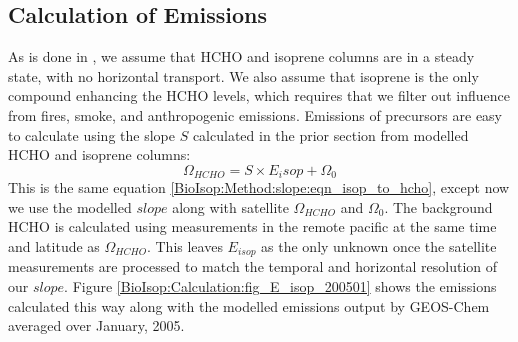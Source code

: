     
    
    
    
    
  \subsection{Calculation of Emissions}
    \label{BioIsop:Calculation}
   
    As is done in \textcite{Palmer2003, Millet2006, Bauwens2016}, we assume that HCHO and isoprene columns are in a steady state, with no horizontal transport.
    We also assume that isoprene is the only compound enhancing the HCHO levels, which requires that we filter out influence from fires, smoke, and anthropogenic emissions.
    Emissions of precursors are easy to calculate using the slope $S$ calculated in the prior section from modelled HCHO and isoprene columns:
    \begin{equation}
    \Omega_{HCHO} = S \times E_isop + \Omega_0
    \end{equation}
    This is the same equation \ref{BioIsop:Method:slope:eqn_isop_to_hcho}, except now we use the modelled $slope$ along with satellite $\Omega_{HCHO}$ and $\Omega_0$.
    The background HCHO is calculated using measurements in the remote pacific at the same time and latitude as $\Omega_{HCHO}$.
    This leaves $E_{isop}$ as the only unknown once the satellite measurements are processed to match the temporal and horizontal resolution of our $slope$.
    Figure \ref{BioIsop:Calculation:fig_E_isop_200501} shows the emissions calculated this way along with the modelled emissions output by GEOS-Chem averaged over January, 2005.
